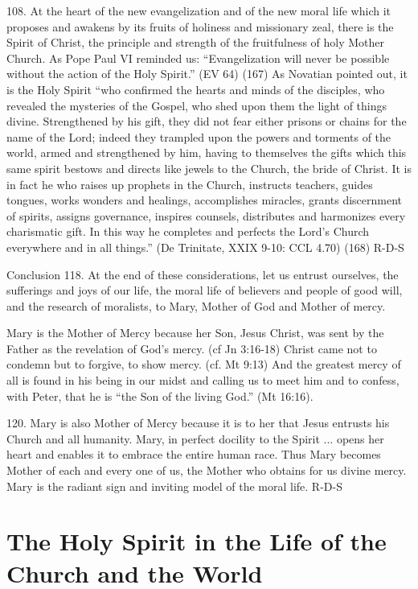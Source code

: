 \documentclass[oneside]{book}
\begin{document}
108. At the heart of the new evangelization and of the new moral life which it
proposes and awakens by its fruits of holiness and missionary zeal, there is the
Spirit of Christ, the principle and strength of the fruitfulness of holy Mother
Church. As Pope Paul VI reminded us: ``Evangelization will never be possible
without the action of the Holy Spirit.'' (EV 64) (167) As Novatian pointed out,
it is the Holy Spirit ``who confirmed the hearts and minds of the disciples, who
revealed the mysteries of the Gospel, who shed upon them the light of things
divine. Strengthened by his gift, they did not fear either prisons or chains for
the name of the Lord; indeed they trampled upon the powers and torments of the
world, armed and strengthened by him, having to themselves the gifts which this
same spirit bestows and directs like jewels to the Church, the bride of
Christ. It is in fact he who raises up prophets in the Church, instructs
teachers, guides tongues, works wonders and healings, accomplishes miracles,
grants discernment of spirits, assigns governance, inspires counsels,
distributes and harmonizes every charismatic gift. In this way he completes and
perfects the Lord's Church everywhere and in all things.'' (De Trinitate, XXIX
9-10: CCL 4.70) (168)
R-D-S

Conclusion
118. At the end of these considerations, let us entrust ourselves, the
sufferings and joys of our life, the moral life of believers and people of good
will, and the research of moralists, to Mary, Mother of God and Mother of mercy.

Mary is the Mother of Mercy because her Son, Jesus Christ, was sent by the
Father as the revelation of God's mercy. (cf Jn 3:16-18) Christ came not to
condemn but to forgive, to show mercy. (cf. Mt 9:13) And the greatest mercy of
all is found in his being in our midst and calling us to meet him and to
confess, with Peter, that he is ``the Son of the living God.'' (Mt 16:16).

120. Mary is also Mother of Mercy because it is to her that Jesus entrusts his
Church and all humanity. Mary, in perfect docility to the Spirit ... opens her
heart and enables it to embrace the entire human race. Thus Mary becomes Mother
of each and every one of us, the Mother who obtains for us divine mercy. Mary is
the radiant sign and inviting model of the moral life.
R-D-S


\chapter{The Holy Spirit in the Life of the Church and the World}
\end{document}
